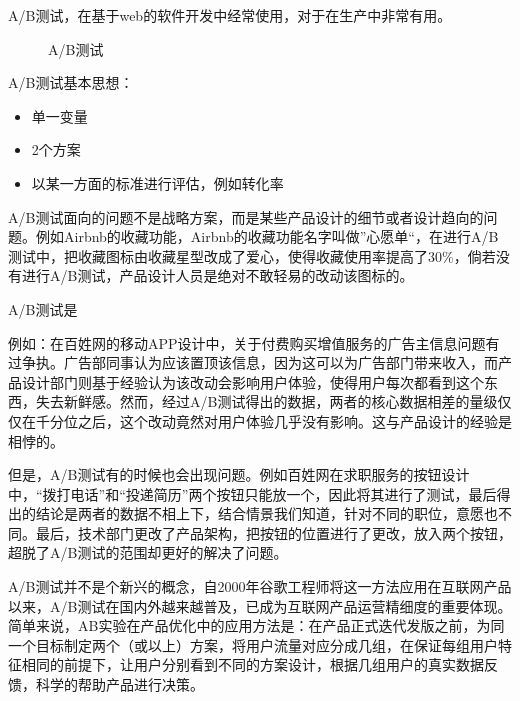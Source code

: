 \documentclass[letterpaper,10pt,english]{sphinxmanual}
\begin{document}
A/B测试，在基于web的软件开发中经常使用，对于在生产中非常有用。

\begin{figure}[H]
\centering
\capstart

\noindent{}
\caption{A/B测试\sphinxfootnotemark[978]}\label{\detokenize{chapter_AI_dive/huidu:id3}}\end{figure}
%
\begin{footnotetext}[978]\sphinxAtStartFootnote
{}
%
\end{footnotetext}\ignorespaces 
A/B测试基本思想：
\begin{itemize}
\item {} 
单一变量

\item {} 
2个方案

\item {} 
以某一方面的标准进行评估，例如转化率

\end{itemize}

A/B测试面向的问题不是战略方案，而是某些产品设计的细节或者设计趋向的问题。例如Airbnb的收藏功能，Airbnb的收藏功能名字叫做”心愿单“，在进行A/B测试中，把收藏图标由收藏星型改成了爱心，使得收藏使用率提高了30\%，倘若没有进行A/B测试，产品设计人员是绝对不敢轻易的改动该图标的。

A/B测试是

例如：在百姓网的移动APP设计中，关于付费购买增值服务的广告主信息问题有过争执。广告部同事认为应该置顶该信息，因为这可以为广告部门带来收入，而产品设计部门则基于经验认为该改动会影响用户体验，使得用户每次都看到这个东西，失去新鲜感。然而，经过A/B测试得出的数据，两者的核心数据相差的量级仅仅在千分位之后，这个改动竟然对用户体验几乎没有影响。这与产品设计的经验是相悖的。

但是，A/B测试有的时候也会出现问题。例如百姓网在求职服务的按钮设计中，“拨打电话”和“投递简历”两个按钮只能放一个，因此将其进行了测试，最后得出的结论是两者的数据不相上下，结合情景我们知道，针对不同的职位，意愿也不同。最后，技术部门更改了产品架构，把按钮的位置进行了更改，放入两个按钮，超脱了A/B测试的范围却更好的解决了问题。

A/B测试并不是个新兴的概念，自2000年谷歌工程师将这一方法应用在互联网产品以来，A/B测试在国内外越来越普及，已成为互联网产品运营精细度的重要体现。简单来说，AB实验在产品优化中的应用方法是：在产品正式迭代发版之前，为同一个目标制定两个（或以上）方案，将用户流量对应分成几组，在保证每组用户特征相同的前提下，让用户分别看到不同的方案设计，根据几组用户的真实数据反馈，科学的帮助产品进行决策。
\end{document}

